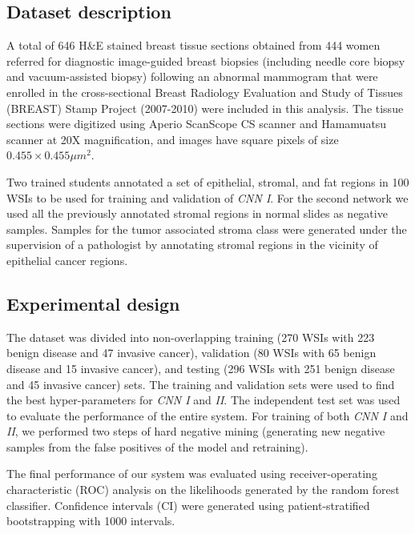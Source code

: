 \documentclass{article}
\begin{document}
\subsection{Dataset description}
A total of 646 H\&E stained breast tissue sections obtained from 444 women referred for diagnostic image-guided breast biopsies (including needle core biopsy and vacuum-assisted biopsy) following an abnormal mammogram that were enrolled in the cross-sectional Breast Radiology Evaluation and Study of Tissues (BREAST) Stamp Project \cite{gierach2014} (2007-2010) were included in this analysis. The tissue sections were digitized using Aperio ScanScope CS scanner and Hamamuatsu scanner at 20X magnification, and images have square pixels of size $0.455 \times 0.455 \mu m^2$. 



Two trained students annotated a set of epithelial, stromal, and fat regions in 100 WSIs to be used for training and validation of \textit{CNN I}. For the second network we used all the previously annotated stromal regions in normal slides as negative samples. Samples for the tumor associated stroma class were generated under the supervision of a pathologist by annotating stromal regions in the vicinity of epithelial cancer regions.
\subsection{Experimental design}
The dataset was divided into non-overlapping training (270 WSIs with 223 benign disease and 47 invasive cancer), validation (80 WSIs with 65 benign disease and 15 invasive cancer), and testing (296 WSIs with 251 benign disease and 45 invasive cancer) sets. The training and validation sets were used to find the best hyper-parameters for \textit{CNN I} and \textit{II}. The independent test set was used to evaluate the performance of the entire system. For training of both \textit{CNN I} and \textit{II}, we performed two steps of hard negative mining (generating new negative samples from the false positives of the model and retraining).

The final performance of our system was evaluated using receiver-operating characteristic (ROC) analysis on the likelihoods generated by the random forest classifier. Confidence intervals (CI) were generated using patient-stratified bootstrapping with 1000 intervals.
\end{document}
